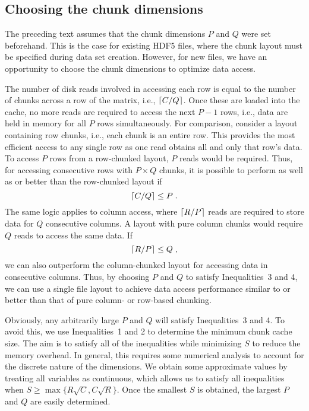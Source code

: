 \documentclass{article}
\begin{document}

\subsection{Choosing the chunk dimensions}
The preceding text assumes that the chunk dimensions $P$ and $Q$ were set beforehand.
This is the case for existing HDF5 files, where the chunk layout must be specified during data set creation.
However, for new files, we have an opportunity to choose the chunk dimensions to optimize data access.

The number of disk reads involved in accessing each row is equal to the number of chunks across a row of the matrix, i.e., $\left \lceil C/Q \right \rceil$.
Once these are loaded into the cache, no more reads are required to access the next $P-1$ rows, i.e., data are held in memory for all $P$ rows simultaneously.
For comparison, consider a layout containing row chunks, i.e., each chunk is an entire row.
This provides the most efficient access to any single row as one read obtains all and only that row's data.
To access $P$ rows from a row-chunked layout, $P$ reads would be required.
Thus, for accessing consecutive rows with $P \times Q$ chunks, it is possible to perform as well as or better than the row-chunked layout if 
\begin{equation}
\left \lceil C/Q \right \rceil \le P \;.
\end{equation}
The same logic applies to column access, where $\left \lceil R/P \right \rceil$ reads are required to store data for $Q$ consecutive columns.
A layout with pure column chunks would require $Q$ reads to access the same data.
If 
\begin{equation}
\left \lceil R/P \right \rceil \le Q \;,
\end{equation}
we can also outperform the column-chunked layout for accessing data in consecutive columns.
Thus, by choosing $P$ and $Q$ to satisfy Inequalities~3 and 4, we can use a single file layout to achieve data access performance similar to or better than that of pure column- or row-based chunking.

Obviously, any arbitrarily large $P$ and $Q$ will satisfy Inequalities~3 and 4.
To avoid this, we use Inequalities~1 and 2 to determine the minimum chunk cache size.
The aim is to satisfy all of the inequalities while minimizing $S$ to reduce the memory overhead.
In general, this requires some numerical analysis to account for the discrete nature of the dimensions.
We obtain some approximate values by treating all variables as continuous, which allows us to satisfy all inequalities when $S \ge \max\{R\sqrt{C}, C\sqrt{R}\}$.
Once the smallest $S$ is obtained, the largest $P$ and $Q$ are easily determined.
\end{document}
